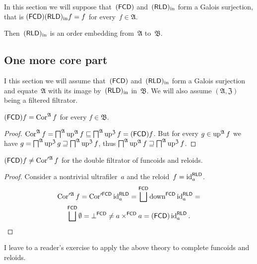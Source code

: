In this section we will suppose that~$(\mathsf{FCD})$ and~$(\mathsf{RLD})_{\mathrm{in}}$
form a Galois surjection, that is $(\mathsf{FCD})(\mathsf{RLD})_{\mathrm{in}} f = f$
for every~$f\in\mathfrak{A}$.

Then~$(\mathsf{RLD})_{\mathrm{in}}$ is an order embedding from~$\mathfrak{A}$
to~$\mathfrak{B}$.

\subsection{One more core part}

I this section we will assume that~$(\mathsf{FCD})$ and~$(\mathsf{RLD})_{\mathrm{in}}$
form a Galois surjection and equate~$\mathfrak{A}$ with its
image by~$(\mathsf{RLD})_{\mathrm{in}}$ in~$\mathfrak{B}$. We will also assume
$(\mathfrak{A},\mathfrak{Z})$ being a filtered filtrator.

\begin{prop}
$(\mathsf{FCD}) f = \operatorname{Cor}^{\mathfrak{A}} f$ for every $f\in\mathfrak{B}$.
\end{prop}

\begin{proof}
$\operatorname{Cor}^{\mathfrak{A}} f = \bigsqcap^{\mathfrak{A}}\operatorname{up}^{\mathfrak{A}} f \sqsubseteq
\bigsqcap^{\mathfrak{A}}\operatorname{up}^{\mathfrak{Z}} f = (\mathsf{FCD}) f$.
But for every $g\in\operatorname{up}^{\mathfrak{A}} f$ we have
$g=\bigsqcap^{\mathfrak{A}}\operatorname{up}^{\mathfrak{Z}} g \sqsupseteq
\bigsqcap^{\mathfrak{A}}\operatorname{up}^{\mathfrak{Z}} f$, thus
$\bigsqcap^{\mathfrak{A}}\operatorname{up}^{\mathfrak{A}} f \sqsupseteq
\bigsqcap^{\mathfrak{A}}\operatorname{up}^{\mathfrak{Z}} f$.
\end{proof}

\begin{example}
$(\mathsf{FCD}) f \ne \operatorname{Cor}'^{\mathfrak{A}} f$ for the double filtrator
of funcoids and reloids.
\end{example}

\begin{proof}
Consider a nontrivial ultrafiler~$a$ and the reloid~$f=\operatorname{id}^{\mathsf{RLD}}_a$.
\begin{multline*}
\Cor'^{\mathfrak{A}} f = \Cor'^{\mathsf{FCD}}\id^{\mathsf{RLD}}_a =
\bigsqcup^{\mathsf{FCD}}\down^{\mathsf{FCD}}\id^{\mathsf{RLD}}_a =\\
\bigsqcup^{\mathsf{FCD}}\emptyset = \bot^{\mathsf{FCD}} \ne
a\times^{\mathsf{FCD}}a = \tofcd\id^{\mathsf{RLD}}_a.
\end{multline*}
\end{proof}

I leave to a reader's exercise to apply the above theory to complete funcoids and reloids.
